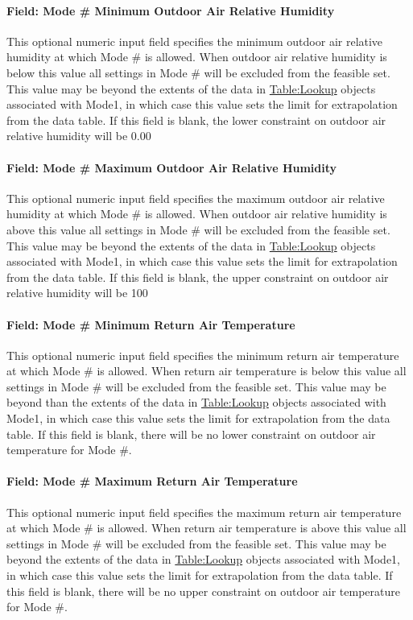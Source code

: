 \paragraph{Field: Mode \# Minimum Outdoor Air Relative Humidity}
This optional numeric input field specifies the minimum outdoor air relative humidity at which Mode \# is allowed. When outdoor air relative humidity is below this value all settings in Mode \# will be excluded from the feasible set. This value may be beyond the extents of the data in \hyperref[tablelookup]{Table:Lookup} objects associated with Mode1, in which case this value sets the limit for extrapolation from the data table. If this field is blank, the lower constraint on outdoor air relative humidity will be 0.00%

\paragraph{Field: Mode \# Maximum Outdoor Air Relative Humidity}
This optional numeric input field specifies the maximum outdoor air relative humidity at which Mode \# is allowed. When outdoor air relative humidity is above this value all settings in Mode \# will be excluded from the feasible set. This value may be beyond the extents of the data in \hyperref[tablelookup]{Table:Lookup} objects associated with Mode1, in which case this value sets the limit for extrapolation from the data table. If this field is blank, the upper constraint on outdoor air relative humidity will be 100%

\paragraph{Field: Mode \# Minimum Return Air Temperature}
This optional numeric input field specifies the minimum return air temperature at which Mode \# is allowed. When return air temperature is below this value all settings in Mode \# will be excluded from the feasible set. This value may be beyond than the extents of the  data in \hyperref[tablelookup]{Table:Lookup} objects associated with Mode1, in which case this value sets the limit for extrapolation from the data table. If this field is blank, there will be no lower constraint on outdoor air temperature for Mode \#.

\paragraph{Field: Mode \# Maximum Return Air Temperature}
This optional numeric input field specifies the maximum return air temperature at which Mode \# is allowed. When return air temperature is above this value all settings in Mode \# will be excluded from the feasible set. This value may be beyond the extents of the data in \hyperref[tablelookup]{Table:Lookup} objects associated with Mode1, in which case this value sets the limit for extrapolation from the data table. If this field is blank, there will be no upper constraint on outdoor air temperature for Mode \#.

